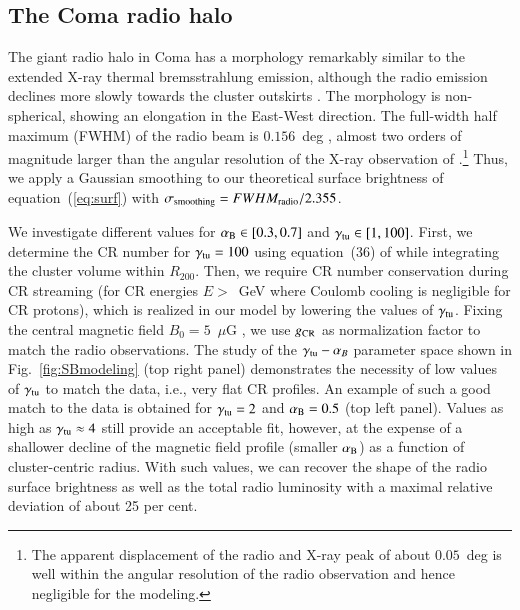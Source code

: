 \documentclass[useAMS,usenatbib]{mn2e}
\begin{document}
\subsection{The Coma radio halo}

The giant radio halo in Coma has a morphology remarkably similar to the extended
X-ray thermal bremsstrahlung emission, although the radio emission declines more
slowly towards the cluster outskirts \citep{1992A&A...259L..31B,
  1997A&A...321...55D}. The morphology is non-spherical, showing an elongation
in the East-West direction.  The full-width half maximum (FWHM) of the radio
beam is $0.156$~deg \citep{1997A&A...321...55D}, almost two orders of magnitude
larger than the angular resolution of the X-ray observation of
\cite{1992A&A...259L..31B}.\footnote{The apparent displacement of the radio and
  X-ray peak of about $0.05$~deg is well within the angular resolution of the
  radio observation and hence negligible for the modeling.}  Thus, we apply a
Gaussian smoothing to our theoretical surface brightness of
equation~(\ref{eq:surf}) with $\sigma_{{\mathrm{smoothing}}} =
FWHM_{{\mathrm{radio}}}/2.355$.

We investigate different values for $\alpha_{{\mathrm{B}}}\in [0.3,0.7]$ and
$\gamma_{{\mathrm{tu}}}\in [1,100]$. First, we determine the CR number for
$\gamma_{{\mathrm{tu}}}=100$ using equation~(36) of \cite{2011A&A...527A..99E} while
integrating the cluster volume within $R_{200}$. Then, we require CR number
conservation during CR streaming (for CR energies $E>$~GeV where Coulomb cooling
is negligible for CR protons), which is realized in our model by lowering the
values of $\gamma_{{\mathrm{tu}}}$. Fixing the central magnetic field
$B_{0}=5$~$\mu$G \citep{2010A&A...513A..30B}, we use $g_{{\mathrm{CR}}}$ as
normalization factor to match the radio observations.  The study of the
$\gamma_{{\mathrm{tu}}}-\alpha_{B}$ parameter space shown in
Fig.~\ref{fig:SBmodeling} (top right panel) demonstrates the necessity of low
values of $\gamma_{{\mathrm{tu}}}$ to match the data, i.e., very flat CR profiles. An
example of such a good match to the data is obtained for $\gamma_{{\mathrm{tu}}}=2$
and $\alpha_{{\mathrm{B}}}=0.5$ (top left panel). Values as high as
$\gamma_{{\mathrm{tu}}} \approx 4$ still provide an acceptable fit, however, at the expense
of a shallower decline of the magnetic field profile (smaller $ \alpha_{{\mathrm{B}}}$) as a
function of cluster-centric radius. With such values, we can recover the shape
of the radio surface brightness as well as the total radio luminosity with a
maximal relative deviation of about 25 per cent.
\end{document}
